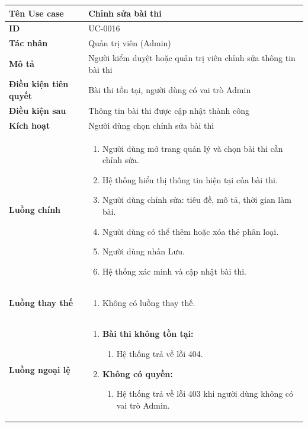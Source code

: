 {
\small
\renewcommand{\arraystretch}{1.15}

\begin{tabularx}{\textwidth}{|>{\raggedright\arraybackslash}p{3.5cm}|>{\raggedright\arraybackslash}X|}
\hline
\textbf{Tên Use case} & Chỉnh sửa bài thi \\
\hline
\textbf{ID} & UC-0016 \\
\hline
\textbf{Tác nhân} & Quản trị viên (Admin) \\
\hline
\textbf{Mô tả} & Người kiểm duyệt hoặc quản trị viên chỉnh sửa thông tin bài thi \\
\hline
\textbf{Điều kiện tiên quyết} & Bài thi tồn tại, người dùng có vai trò Admin \\
\hline
\textbf{Điều kiện sau} & Thông tin bài thi được cập nhật thành công \\
\hline
\textbf{Kích hoạt} & Người dùng chọn chỉnh sửa bài thi \\
\hline
\textbf{Luồng chính} &
\begin{enumerate}
    \item Người dùng mở trang quản lý và chọn bài thi cần chỉnh sửa.
    \item Hệ thống hiển thị thông tin hiện tại của bài thi.
    \item Người dùng chỉnh sửa: tiêu đề, mô tả, thời gian làm bài.
    \item Người dùng có thể thêm hoặc xóa thẻ phân loại.
    \item Người dùng nhấn Lưu.
    \item Hệ thống xác minh và cập nhật bài thi.
\end{enumerate} \\
\hline
\textbf{Luồng thay thế} &
\begin{enumerate}
    \item Không có luồng thay thế.
\end{enumerate} \\
\hline
\textbf{Luồng ngoại lệ} &
\begin{enumerate}
    \item \textbf{Bài thi không tồn tại:}
    \begin{enumerate}
        \item[1Err.] Hệ thống trả về lỗi 404.
    \end{enumerate}
    \item \textbf{Không có quyền:}
    \begin{enumerate}
        \item[1Err2.] Hệ thống trả về lỗi 403 khi người dùng không có vai trò Admin.
    \end{enumerate}
\end{enumerate} \\
\hline
\end{tabularx}
}
